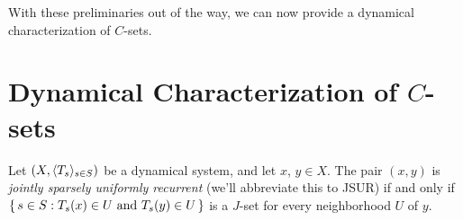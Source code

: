 With these preliminaries out of the way, we can now provide a
dynamical characterization of $C$-sets.

\section{Dynamical Characterization of $C$-sets}
\label{sec:dyncsets}
 \begin{defn}
    \label{defn:JSUR}
    Let $(X, \langle T_s \rangle_{s \in S})$ be a dynamical system, and let $x$, $y \in X$. 
    The pair $(x,y)$ is \textsl{jointly sparsely uniformly recurrent}
    (we'll abbreviate this to JSUR) if and only if $\{\, s \in S :
    \hbox{$T_s(x) \in U$ and $T_s(y) \in U$} \,\}$ is a $J$-set for every
    neighborhood $U$ of $y$.%
  \end{defn}


